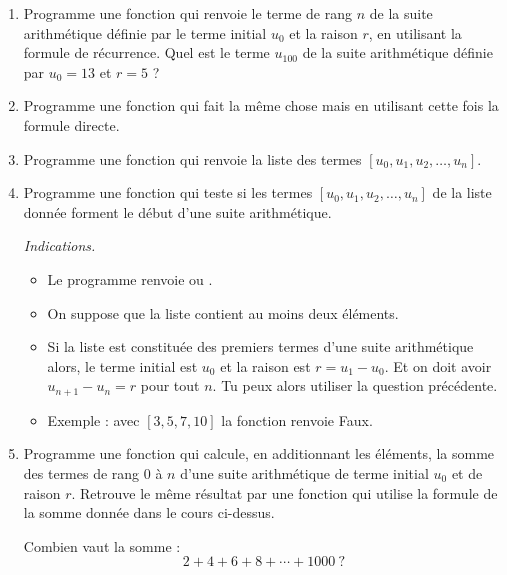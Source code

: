 \documentclass[11pt,class=report,crop=false]{standalone}
\begin{document}


\begin{activite}


\begin{enumerate}
  \item Programme une fonction  qui renvoie le terme de rang $n$ de la suite arithmétique définie par le terme initial $u_0$ et la raison $r$, en utilisant la formule de récurrence.
  Quel est le terme $u_{100}$ de la suite arithmétique définie par $u_0 = 13$ et $r=5$ ?
  
  \item Programme une fonction  qui fait la même chose mais en utilisant cette fois la formule directe.
  
  \item Programme une fonction  qui renvoie la liste des termes $[u_0,u_1,u_2,\ldots,u_n]$.
  
  \item Programme une fonction  qui teste si les termes $[u_0,u_1,u_2,\ldots,u_n]$ de la liste donnée forment le début d'une suite arithmétique.
  
  \emph{Indications.} 
  \begin{itemize}
    \item Le programme renvoie  ou .
    \item On suppose que la liste contient au moins deux éléments.
    \item Si la liste est constituée des premiers termes d'une suite arithmétique alors, le terme initial est $u_0$ et la raison est $r= u_1-u_0$. 
    Et on doit avoir $u_{n+1}-u_n = r$ pour tout $n$. Tu peux alors utiliser la question précédente.   
    \item Exemple : avec $[3,5,7,10]$ la fonction renvoie \og{}Faux\fg{}.
  \end{itemize}
  
  \item Programme une fonction  
  qui calcule, en additionnant les éléments, la somme des termes de rang $0$ à $n$ d'une suite arithmétique de terme initial $u_0$ et de raison $r$. 
Retrouve le même résultat par une fonction  
qui utilise la formule de la somme donnée dans le cours ci-dessus.

Combien vaut la somme :
$$2+4+6+8+\cdots + 1000 \ ?$$
  
\end{enumerate} 
\end{activite}
\end{document}

